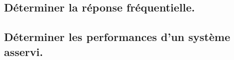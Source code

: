 \documentclass[10pt,fleqn]{article}
\newcommand{\repRel}{../..}
\newcommand{\repStyle}{\repRel/Style}
\newcommand{\td}{fichier_td}
\newcommand{\repExos}{\repRel/ExercicesCompetences}
\newcommand{\repExo}{dossier}
\begin{document}
\subsection{Déterminer la réponse fréquentielle. } 

\begin{multicols}{2} 

\renewcommand{\repExo}{\repExos/C2_MettreEnOeuvreDemarche/C2_02_DiagrammeBode/510_Divers}
\renewcommand{\td}{510_Divers}
\graphicspath{{\repStyle/png/}{\repExo/images/}}


\renewcommand{\repExo}{\repExos/C2_MettreEnOeuvreDemarche/C2_02_DiagrammeBode/511_Divers}
\renewcommand{\td}{511_Divers}
\graphicspath{{\repStyle/png/}{\repExo/images/}}


\end{multicols}

\subsection{Déterminer les performances d'un système asservi.} 
\end{document}

